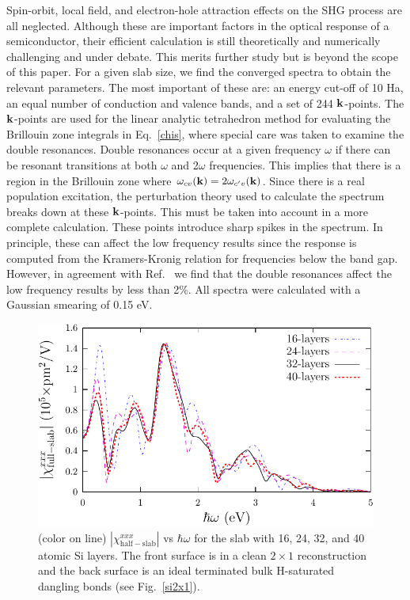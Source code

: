 \documentclass[floatfix,prb,aps,superscriptaddress,11pt,preprint,letterpaper]{revtex4}
\begin{document}
Spin-orbit, local field, and electron-hole 
attraction\cite{beyond}
effects on the SHG process are all neglected.
Although these are important factors in the optical response of a semiconductor,
their efficient calculation is still theoretically and  
numerically challenging and  
under debate. This merits further study but is beyond the scope of this paper.
For a given slab size, we find the converged spectra 
to obtain the relevant parameters. The most important of 
these are: an energy cut-off of 10 Ha, an equal number of conduction and 
valence bands, and a set of 244 $\mathbf{k}$-points.
The $\mathbf{k}$-points are used for the linear analytic 
tetrahedron method for evaluating the
Brillouin zone integrals in Eq.~\eqref{chis}, 
where special care was taken to examine the double resonances.\cite{nastosPRB05}
Double resonances occur at a given frequency $\omega$ if there can be 
resonant transitions at both $\omega$ and 2$\omega$ frequencies. This 
implies that there is a region in the Brillouin zone where 
$\omega_{cv}(\mathbf{k})=2 \omega_{c'v}(\mathbf{k})$. Since there is a real population 
excitation, the perturbation theory used to calculate the spectrum breaks 
down at these $\mathbf{k}$-points. This must be taken into account in a more 
complete calculation. These points introduce sharp spikes in the spectrum. 
In principle, these can affect the low frequency results since the response 
is computed from the Kramers-Kronig relation for frequencies below the band 
gap. However, in agreement with Ref.~ we find that 
the double resonances affect the low frequency results by less than 2\%. 
All spectra were calculated with a Gaussian smearing of 0.15 eV.
\begin{figure}
\centering 
\includegraphics[scale=.8]{plots/fig1}
\caption{(color on line) 
$|\chi_{\mathrm{half-slab}}^{xxx}|$ vs $\hbar\omega$ 
for the slab
with 16, 24, 32, and 40 atomic Si layers. The front surface 
is in a clean $2\times 1$ reconstruction and the back 
surface is an ideal terminated bulk H-saturated dangling bonds (see Fig.~\ref{si2x1}).
\label{fig1}} 
\end{figure}
\end{document}
